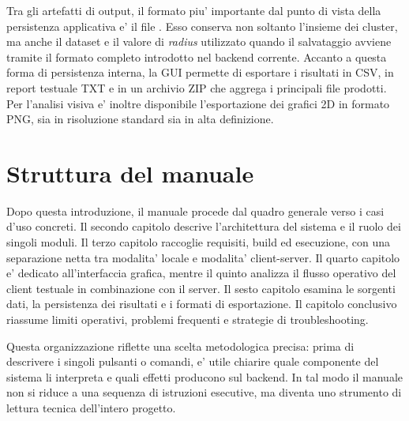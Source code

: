 Tra gli artefatti di output, il formato piu' importante dal punto di vista della
persistenza applicativa e' il file . Esso conserva non soltanto l'insieme
dei cluster, ma anche il dataset e il valore di \emph{radius} utilizzato quando il
salvataggio avviene tramite il formato completo introdotto nel backend corrente. Accanto
a questa forma di persistenza interna, la GUI permette di esportare i risultati in CSV,
in report testuale TXT e in un archivio ZIP che aggrega i principali file prodotti. Per
l'analisi visiva e' inoltre disponibile l'esportazione dei grafici 2D in formato PNG, sia
in risoluzione standard sia in alta definizione.

\section{Struttura del manuale}

Dopo questa introduzione, il manuale procede dal quadro generale verso i casi d'uso
concreti. Il secondo capitolo descrive l'architettura del sistema e il ruolo dei singoli
moduli. Il terzo capitolo raccoglie requisiti, build ed esecuzione, con una separazione
netta tra modalita' locale e modalita' client-server. Il quarto capitolo e' dedicato
all'interfaccia grafica, mentre il quinto analizza il flusso operativo del client
testuale in combinazione con il server. Il sesto capitolo esamina le sorgenti dati, la
persistenza dei risultati e i formati di esportazione. Il capitolo conclusivo riassume
limiti operativi, problemi frequenti e strategie di troubleshooting.

Questa organizzazione riflette una scelta metodologica precisa: prima di descrivere i
singoli pulsanti o comandi, e' utile chiarire quale componente del sistema li interpreta
e quali effetti producono sul backend. In tal modo il manuale non si riduce a una
sequenza di istruzioni esecutive, ma diventa uno strumento di lettura tecnica dell'intero progetto.
